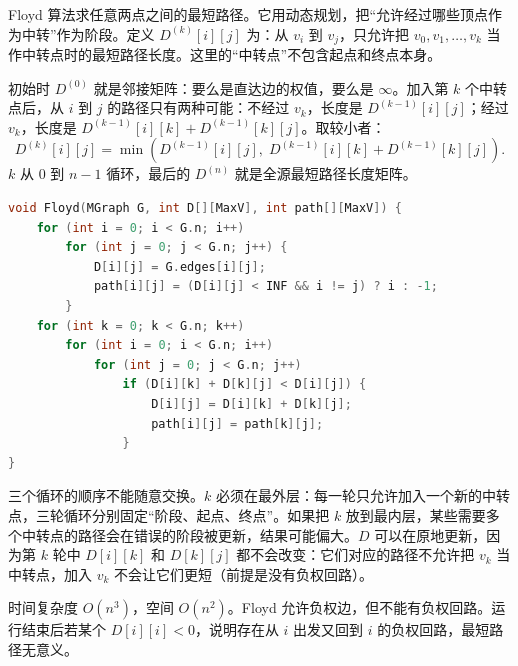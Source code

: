 Floyd 算法求任意两点之间的最短路径。它用动态规划，把“允许经过哪些顶点作为中转”作为阶段。定义 $D^{(k)}[i][j]$ 为：从 $v_i$ 到 $v_j$，只允许把 $v_0,v_1,\ldots,v_k$ 当作中转点时的最短路径长度。这里的“中转点”不包含起点和终点本身。

初始时 $D^{(0)}$ 就是邻接矩阵：要么是直达边的权值，要么是 $\infty$。加入第 $k$ 个中转点后，从 $i$ 到 $j$ 的路径只有两种可能：不经过 $v_k$，长度是 $D^{(k-1)}[i][j]$；经过 $v_k$，长度是 $D^{(k-1)}[i][k]+D^{(k-1)}[k][j]$。取较小者：
\[
D^{(k)}[i][j]
=\min\left(D^{(k-1)}[i][j],\;
D^{(k-1)}[i][k]+D^{(k-1)}[k][j]\right).
\]
$k$ 从 $0$ 到 $n-1$ 循环，最后的 $D^{(n)}$ 就是全源最短路径长度矩阵。

\begin{lstlisting}[language=C]
void Floyd(MGraph G, int D[][MaxV], int path[][MaxV]) {
    for (int i = 0; i < G.n; i++)
        for (int j = 0; j < G.n; j++) {
            D[i][j] = G.edges[i][j];
            path[i][j] = (D[i][j] < INF && i != j) ? i : -1;
        }
    for (int k = 0; k < G.n; k++)
        for (int i = 0; i < G.n; i++)
            for (int j = 0; j < G.n; j++)
                if (D[i][k] + D[k][j] < D[i][j]) {
                    D[i][j] = D[i][k] + D[k][j];
                    path[i][j] = path[k][j];
                }
}
\end{lstlisting}

三个循环的顺序不能随意交换。$k$ 必须在最外层：每一轮只允许加入一个新的中转点，三轮循环分别固定“阶段、起点、终点”。如果把 $k$ 放到最内层，某些需要多个中转点的路径会在错误的阶段被更新，结果可能偏大。$D$ 可以在原地更新，因为第 $k$ 轮中 $D[i][k]$ 和 $D[k][j]$ 都不会改变：它们对应的路径不允许把 $v_k$ 当中转点，加入 $v_k$ 不会让它们更短（前提是没有负权回路）。

时间复杂度 $O(n^3)$，空间 $O(n^2)$。Floyd 允许负权边，但不能有负权回路。运行结束后若某个 $D[i][i]<0$，说明存在从 $i$ 出发又回到 $i$ 的负权回路，最短路径无意义。

